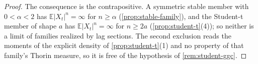 \begin{proof}
The consequence is the contrapositive. A symmetric stable member with $0 < \alpha < 2$ has
$\mathbb{E}|X_t|^n = \infty$ for $n \ge \alpha$ (\ref{prop:stable-family}), and the Student-t
member of shape $a$ has $\mathbb{E}|X_t|^n = \infty$ for $n \ge 2a$ (\ref{prop:student-t}(4)); so
neither is a limit of families realized by lag sections. The second exclusion reads the moments of
the explicit density of \ref{prop:student-t}(1) and no property of that family's Thorin measure,
so it is free of the hypothesis of \ref{rem:student-ggc}.
\end{proof}


